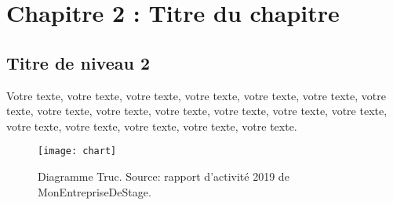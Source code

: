 \chapter{Chapitre 2 : Titre du chapitre}


\section{Titre de niveau 2}

Votre texte, votre texte, votre texte, votre texte, votre texte, votre texte, votre texte, votre texte, votre texte, votre texte, votre texte, votre texte, votre texte, votre texte, votre texte, votre texte, votre texte, votre texte.

\begin{figure}[tbph!]
	\centering
	\texttt{[image: chart]}
	\caption[Diagramme Truc.]{Diagramme Truc. Source: rapport d'activité 2019 de MonEntrepriseDeStage.}
	\label{fig:chart3}
\end{figure}